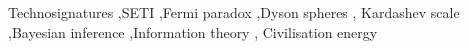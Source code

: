 \documentclass[preprint,12pt,authoryear]{elsarticle}
\begin{document}
\begin{frontmatter}
\begin{keyword}
Technosignatures \sep SETI \sep Fermi paradox \sep Dyson spheres \sep
Kardashev scale \sep Bayesian inference \sep Information theory \sep
Civilisation energy
\end{keyword}

\end{frontmatter}





\end{document}
